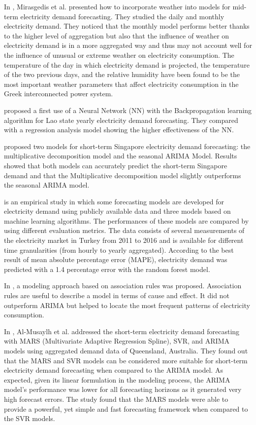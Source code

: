 In \cite{MIRASGEDIS2006208}, Mirasgedis et al. presented how to incorporate weather into models for mid-term electricity demand forecasting.
They studied the daily and monthly electricity demand.
They noticed that the monthly model performs better thanks to the higher level of aggregation but also that the influence of weather on electricity demand is in a more aggregated way and thus may not account well for the influence of unusual or extreme weather on electricity consumption.
The temperature of the day in which electricity demand is projected, the temperature of the two previous days, and the relative humidity have been found to be the most important weather parameters that affect electricity consumption in the Greek interconnected power system.

\cite{5686767} proposed a first use of a Neural Network (NN) with the Backpropagation learning algorithm for Lao state yearly electricity demand forecasting.
They compared with a regression analysis model showing the higher effectiveness of the NN.

\cite{5518553} proposed two models for short-term Singapore electricity demand forecasting: the multiplicative decomposition model and the seasonal ARIMA Model.
Results showed that both models can accurately predict the short-term Singapore demand and that the Multiplicative decomposition model slightly outperforms the seasonal ARIMA model.

\cite{8093428} is an empirical study in which some forecasting models are developed for electricity demand using publicly available data and three models based on machine learning algorithms.
The performances of these models are compared by using different evaluation metrics.
The data consists of several measurements of the electricity market in Turkey from 2011 to 2016 and is available for different time granularities (from hourly to yearly aggregated).
According to the best result of mean absolute percentage error (MAPE), electricity demand was predicted with a 1.4 percentage error with the random forest model.

In \cite{9046493}, a modeling approach based on association rules was proposed.
Association rules are useful to describe a model in terms of cause and effect.
It did not outperform ARIMA but helped to locate the most frequent patterns of electricity consumption.

In \cite{ALMUSAYLH20181}, Al-Musaylh et al. addressed the short-term electricity demand forecasting with MARS (Multivariate Adaptive Regression Spline), SVR, and ARIMA models using aggregated demand data of Queensland, Australia.
They found out that the MARS and SVR models can be considered more suitable for short-term electricity demand forecasting when compared to the ARIMA model.
As expected, given its linear formulation in the modeling process, the ARIMA model’s performance was lower for all forecasting horizons as it generated very high forecast errors.
The study found that the MARS models were able to provide a powerful, yet simple and fast forecasting framework when compared to the SVR models.

